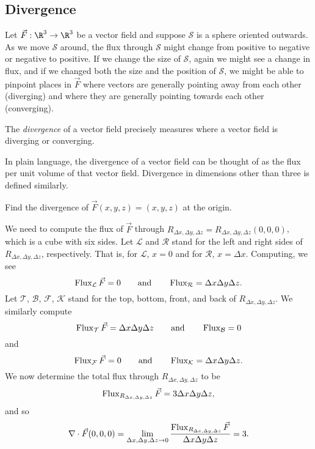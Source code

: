 \subsection{Divergence}

Let $\vec F:\R^3\to\R^3$ be a vector field and suppose $\mathcal S$ is a 
sphere oriented outwards.  As we move $\mathcal S$ around,
the flux through $\mathcal S$ might change from positive to negative or negative to positive.
If we change the size of $\mathcal S$, again we might see a change in flux, and if
we changed both the size and the position of $\mathcal S$, we might be able to pinpoint
places in $\vec F$ where vectors are generally pointing away from each other (diverging)
and where they are generally pointing towards each other (converging).


The \emph{divergence} of a vector field precisely measures
where a vector field is diverging or converging.  

\DefDivergence

In plain language, the divergence of a vector field can be thought of as the flux per unit volume
of that vector field.  Divergence in dimensions other than three is defined similarly.

\begin{example}
	Find the divergence of $\vec F(x,y,z)=(x,y,z)$ at the origin.

	We need to compute the flux of $\vec F$ through $R_{\Delta x,\Delta y,\Delta z} = R_{\Delta x,\Delta y,\Delta z}(0,0,0)$,
	which is a cube with six sides.  Let $\mathcal L$ and $\mathcal R$ stand for the left and
	right sides of $R_{\Delta x,\Delta y, \Delta z}$, respectively.
	That is, for $\mathcal L$, $x=0$ and for $\mathcal R$, $x=\Delta x$.  Computing, we see
	\[
		\operatorname{Flux}_{\mathcal L}\vec F = 0\qquad\text{and}
		\qquad \operatorname{Flux}_{\mathcal R} = \Delta x\Delta y\Delta z.
	\]
	Let $\mathcal T$, $\mathcal B$, $\mathcal F$, $\mathcal K$ stand for the top, bottom, front,
	and back of $R_{\Delta x,\Delta y,\Delta z}$.  We similarly compute
	\[
		\operatorname{Flux}_{\mathcal T}\vec F = \Delta x\Delta y\Delta z\qquad\text{and}
		\qquad \operatorname{Flux}_{\mathcal B} = 0
	\]
	and
	\[
		\operatorname{Flux}_{\mathcal F}\vec F = 0\qquad\text{and}
		\qquad \operatorname{Flux}_{\mathcal K} = \Delta x\Delta y\Delta z.
	\]
	We now determine the total flux through $R_{\Delta x,\Delta y, \Delta z}$ to be
	\[
		\operatorname{Flux}_{R_{\Delta x,\Delta y, \Delta z}}\vec F = 3\Delta x\Delta y\Delta z,
	\]
	and so
	\[
		\nabla \cdot \vec F(0,0,0) = \lim_{\Delta x,\Delta y,\Delta z\to 0}\frac{\operatorname{Flux}_{R_{\Delta x,\Delta y, \Delta z}}\vec F}{\Delta x\Delta y\Delta z} = 3.
	\]
\end{example}


